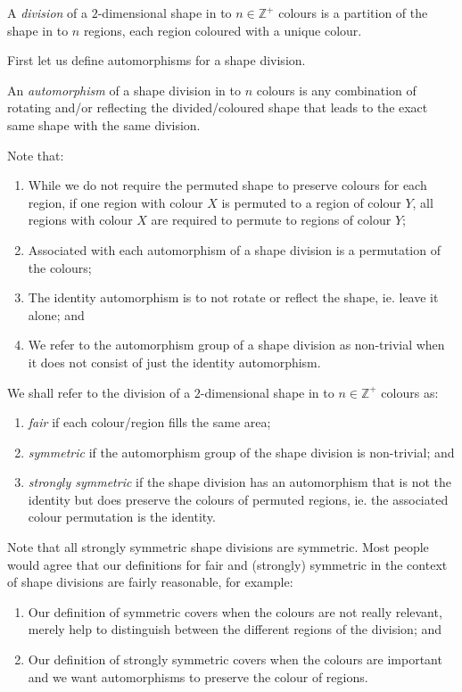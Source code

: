 \begin{definition}
	A \textit{division} of a $2$-dimensional shape in to $n \in \mathbb{Z}^+$ colours is a partition of the shape in to $n$ regions, each region coloured with a unique colour. 
\end{definition}

First let us define automorphisms for a shape division.

\begin{definition}
	An \textit{automorphism} of a shape division in to $n$ colours is any combination of rotating and/or reflecting the divided/coloured shape that leads to the exact same shape with the same division. 
\end{definition}

Note that:
\begin{enumerate}
	\item While we do not require the permuted shape to preserve colours for each region, if one region with colour $X$ is permuted to a region of colour $Y$, all regions with colour $X$ are required to permute to regions of colour $Y$; 
	\item Associated with each automorphism of a shape division is a permutation of the colours;
	\item The identity automorphism is to not rotate or reflect the shape, ie. leave it alone; and
	\item We refer to the automorphism group of a shape division as non-trivial when it does not consist of just the identity automorphism.
\end{enumerate}

\begin{definition}
	We shall refer to the division of a $2$-dimensional shape in to $n \in \mathbb{Z}^+$ colours as:
	\begin{enumerate}
		\item \textit{fair} if each colour/region fills the same area;
		\item \textit{symmetric} if the automorphism group of the shape division is non-trivial; and
		\item \textit{strongly symmetric} if the shape division has an automorphism that is not the identity but does preserve the colours of permuted regions, ie. the associated colour permutation is the identity. 
	\end{enumerate}
\end{definition}

Note that all strongly symmetric shape divisions are symmetric. Most people would agree that our definitions for fair and (strongly) symmetric in the context of shape divisions are fairly reasonable, for example:
\begin{enumerate}
	\item Our definition of symmetric covers when the colours are not really relevant, merely help to distinguish between the different regions of the division; and
	\item Our definition of strongly symmetric covers when the colours are important and we want automorphisms to preserve the colour of regions.
\end{enumerate}

